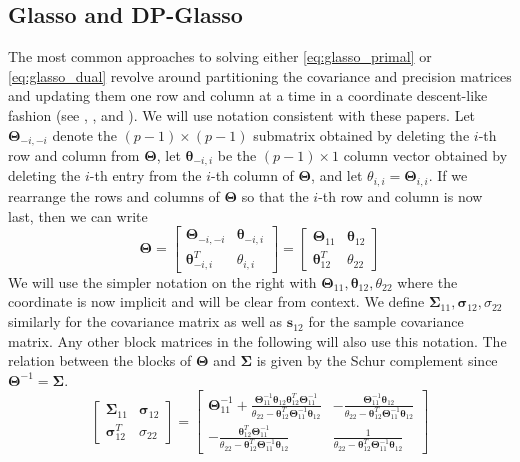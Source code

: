 \documentclass[10pt, letterpaper]{article}
\newcommand{\cov}{\boldsymbol \Sigma}
\newcommand{\scov}{\boldsymbol \sigma}
\newcommand{\sscov}{\sigma}
\newcommand{\preci}{\boldsymbol \Theta}
\newcommand{\spreci}{\boldsymbol \theta} %
\newcommand{\sspreci}{\theta} %
\newcommand{\ssampcov}{\boldsymbol s}
\begin{document}
\subsection{Glasso and DP-Glasso}

The most common approaches to solving either \ref{eq:glasso_primal} or \ref{eq:glasso_dual} revolve around partitioning the covariance and precision matrices and updating them one row and column at a time in a coordinate descent-like fashion (see \cite{GLASSO}, \cite{Banerjee}, and \cite{MH}).  We will use notation consistent with these papers.  Let $\preci_{-i,-i}$ denote the $(p-1) \times (p-1)$ submatrix obtained by deleting the $i$-th row and column from $\preci$, let $\spreci_{-i,i}$ be the $(p-1) \times 1$ column vector obtained by deleting the $i$-th entry from the $i$-th column of $\preci$, and let $\sspreci_{i,i} = \preci_{i,i}$.  If we rearrange the rows and columns of $\preci$ so that the $i$-th row and column is now last, then we can write
\[
\preci  = \begin{bmatrix}
\preci_{-i,-i} & \spreci_{-i,i}\\
\spreci_{-i,i}^T & \sspreci_{i,i}
\end{bmatrix}
= \begin{bmatrix}
\preci_{11} & \spreci_{12}\\
\spreci_{12}^T & \sspreci_{22}
\end{bmatrix}
\]
We will use the simpler notation on the right with $\preci_{11}, \spreci_{12}, \sspreci_{22}$ where the coordinate is now implicit and will be clear from context.  We define $\cov_{11},\scov_{12},\sscov_{22}$ similarly for the covariance matrix as well as $\ssampcov_{12}$ for the sample covariance matrix.  Any other block matrices in the following will also use this notation.  The relation between the blocks of $\preci$ and $\cov$ is given by the Schur complement since $\preci^{-1} = \cov$.
\begin{equation}
\begin{bmatrix}
\cov_{11} & \scov_{12}\\
\scov_{12}^T & \sscov_{22}
\end{bmatrix}
= \begin{bmatrix}
\preci_{11}^{-1} + \frac{\preci_{11}^{-1} \spreci_{12} \spreci_{12}^T \preci_{11}^{-1} }{\sspreci_{22} - \spreci_{12}^T \preci_{11}^{-1} \spreci_{12} } 
& -\frac{  \preci_{11}^{-1} \spreci_{12} }{ \sspreci_{22} - \spreci_{12}^T \preci_{11}^{-1} \spreci_{12} }\\[8pt]
-\frac{  \spreci_{12}^T \preci_{11}^{-1}  }{ \sspreci_{22} - \spreci_{12}^T \preci_{11}^{-1} \spreci_{12} }
& \frac{  1 }{ \sspreci_{22} - \spreci_{12}^T \preci_{11}^{-1} \spreci_{12} }
\end{bmatrix}
\label{eq:schur}
\end{equation}
\end{document}
